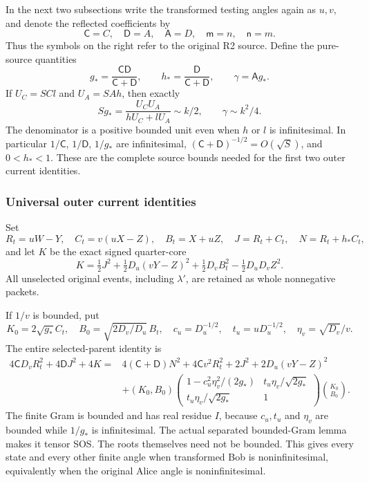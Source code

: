 In the next two subsections write the transformed testing angles again
as $u,v$, and denote the reflected coefficients by
\[
\mathsf C=C,\quad\mathsf D=A,\quad\mathsf A=D,
\quad\mathsf m=n,\quad\mathsf n=m.
\]
Thus the symbols on the right refer to the original R2 source.
Define the pure-source quantities
\[
g_* =\frac{\mathsf C\mathsf D}{\mathsf C+\mathsf D},\qquad
h_* =\frac{\mathsf D}{\mathsf C+\mathsf D},\qquad
\gamma=\mathsf A g_*.
\tag{R2O7}
\]
If $U_C=SC l$ and $U_A=SAh$, then exactly
\[
Sg_* =\frac{U_CU_A}{hU_C+lU_A}\sim k/2,
\qquad \gamma\sim k^2/4.
\tag{R2O8}
\]
The denominator is a positive bounded unit even when $h$ or $l$ is
infinitesimal.  In particular $1/\mathsf C$, $1/\mathsf D$,
$1/g_*$ are infinitesimal,
$(\mathsf C+\mathsf D)^{-1/2}=O(\sqrt S)$, and $0<h_*<1$.
These are the complete source bounds needed for the first two outer
current identities.

\subsubsection*{Universal outer current identities}

Set
\[
R_t=uW-Y,\quad C_t=v(uX-Z),\quad B_t=X+uZ,\quad
J=R_t+C_t,\quad N=R_t+h_*C_t,
\]
and let $K$ be the exact signed quarter-core
\[
K=\tfrac12J^2+\tfrac12D_u(vY-Z)^2
 +\tfrac12D_vB_t^2-\tfrac12D_uD_vZ^2.
\tag{R2O9}
\]
All unselected original events, including $\lambda'$, are retained
as whole nonnegative packets.

If $1/v$ is bounded, put
\[
K_0=2\sqrt{g_*}C_t,\quad B_0=\sqrt{2D_v/D_u}\,B_t,
\quad c_u=D_u^{-1/2},\quad t_u=uD_u^{-1/2},\quad
\eta_v=\sqrt{D_v}/v.
\]
The entire selected-parent identity is
\begin{align*}
4\mathsf C D_vR_t^2+4\mathsf D J^2+4K
={}&4(\mathsf C+\mathsf D)N^2+4\mathsf C v^2R_t^2
 +2J^2+2D_u(vY-Z)^2\\
&+(K_0,B_0)
\begin{pmatrix}
1-c_u^2\eta_v^2/(2g_*)&t_u\eta_v/\sqrt{2g_*}\\
t_u\eta_v/\sqrt{2g_*}&1
\end{pmatrix}
\binom{K_0}{B_0}.
\tag{R2O10}
\end{align*}
The finite Gram is bounded and has real residue $I$, because $c_u,t_u$
and $\eta_v$ are bounded while $1/g_*$ is infinitesimal.  The actual
separated bounded-Gram lemma makes it tensor SOS.  The roots themselves
need not be bounded.  This gives every state and every other finite angle
when transformed Bob is noninfinitesimal, equivalently when the original
Alice angle is noninfinitesimal.

